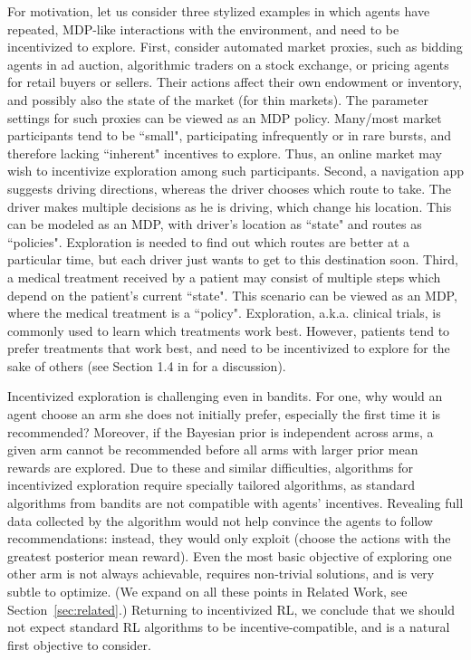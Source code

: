 For motivation, let us consider three stylized examples in which agents have repeated, MDP-like interactions with the environment, and need to be incentivized to explore.
First, consider automated market proxies, such as bidding agents in ad auction,  algorithmic traders on a stock exchange, or pricing agents for retail buyers or sellers. Their actions affect their own endowment or inventory, and possibly also the state of the market (\eg for thin markets). The parameter settings for such proxies can be viewed as an MDP policy. Many/most market participants tend to be ``small", participating infrequently or in rare bursts, and therefore lacking ``inherent" incentives to explore. Thus, an online market may wish to incentivize exploration among such participants. Second, a navigation app suggests driving directions, whereas the driver chooses which route to take. The driver makes multiple decisions as he is driving, which change his location. This can be modeled as an MDP, with driver's location as ``state" and routes as ``policies". Exploration is needed to find out which routes are better at a particular time, but each driver just wants to get to this destination soon. Third, a medical treatment received by a patient may consist of multiple steps which depend on the patient's current ``state". This scenario can be viewed as an MDP, where the medical treatment is a ``policy". Exploration, a.k.a. clinical trials, is commonly used to learn which treatments work best. However, patients tend to prefer treatments that work best, and need to be incentivized to explore for the sake of others (see Section 1.4 in \cite{ICexploration-ec15} for a discussion).



%

Incentivized exploration is challenging even in bandits. For one, why would an agent choose an arm she does not initially prefer, especially the first time it is recommended? Moreover, if the Bayesian prior is independent across arms, a given arm cannot be recommended before all arms with larger prior mean rewards are explored. Due to these and similar difficulties, algorithms for incentivized exploration require specially tailored algorithms, as standard algorithms from bandits are not compatible with agents' incentives. Revealing full data collected by the algorithm would not help convince the agents to follow  recommendations: instead, they would only exploit ({\ie choose} the actions with the greatest posterior mean reward). Even the most basic objective of exploring one other arm is not always achievable, requires non-trivial solutions, and is very subtle to optimize. (We expand on all these points in Related Work, see Section~\ref{sec:related}.) Returning to incentivized RL, we conclude that we should not expect  standard RL algorithms to be incentive-compatible, and \traversal is a natural first objective to consider.

